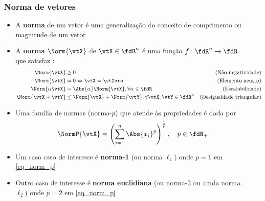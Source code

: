 \begin{frame}
  \frametitle{Norma de vetores}
  \begin{itemize}
    \item A \textbf{\alert{norma}} de um vetor é uma generalização do conceito de comprimento ou magnitude de um vetor
    \item A \textbf{\alert{norma}} $\Norm{\vtX}$ de $\vtX \in \fdR^n$ é uma função $f : \fdR^n \rightarrow \fdR$ que satisfaz \cite[pág. 46]{Chen1999}:
    {\small\begin{subequations}
      \begin{align}
        \Norm{\vtX} &\geq 0 & \text{(Não-negatividade)} \\
        \Norm{\vtX} &= 0 \Leftrightarrow \vtX = \vtZero & \text{(Elemento neutro)} \\
        \Norm{\alpha\vtX} &= \Abs{\alpha}\Norm{\vtX}, \forall \alpha \in \fdR & \text{(Escalabilidade)} \\
        \Norm{\vtX + \vtY} &\leq \Norm{\vtX} + \Norm{\vtY}, \forall \vtX, \vtY \in \fdR^n & \text{(Desigualdade triangular)}
      \end{align}
    \end{subequations}}
    \item Uma família de normas (norma-$p$) que atende às propriedades é dada por
    \begin{equation}\label{eq_norm_p}
      \NormP{\vtX} = \left(\sum\limits_{i = 1}^n \Abs{x_i}^p\right)^{\frac{1}{p}}, \quad p \in \fdN_+
    \end{equation}
    \item Um caso caso de interesse é \textbf{\alert{norma-1}} (ou norma $\ell_1$) onde $p = 1$ em \eqref{eq_norm_p}
    \item Outro caso de interesse é \textbf{\alert{norma euclidiana}} (ou norma-2 ou ainda norma $\ell_2$) onde $p = 2$ em \eqref{eq_norm_p}
  \end{itemize}
\end{frame}

